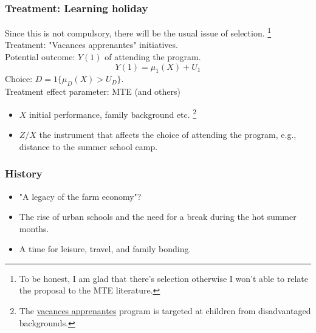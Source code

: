 \documentclass[10pt,mathserif,aspectratio=169]{beamer}
\begin{document}
\begin{frame}[label=summerschool]
  \frametitle{Treatment: Learning holiday}
  Since this is not compulsory, there will be the usual issue of selection.
  \footnote{To be honest, I am glad that there's selection otherwise I won't able to relate the proposal to the MTE literature.}
  \\
  \alert{Treatment}: "Vacances apprenantes" initiatives.\\
  \alert{Potential outcome}: $Y(1)$ of attending the program.
  $$ Y(1) = \mu_1(X)+U_1$$
  \alert{Choice}: $D=1\{\mu_D(X)>U_D\}$.\\
  \alert{Treatment effect parameter}: MTE (and others)
  \begin{itemize}
    \item $X$ initial performance, family background etc. \footnote{The \href{https://www.aide-sociale.fr/vacances-apprenantes/}{vacances apprenantes} program is targeted at children from disadvantaged backgrounds.}
    \item $Z/X$ the instrument that affects the choice of attending the program, e.g., distance to the summer school camp.
  \end{itemize}
\end{frame}

\begin{frame}
  \frametitle{History}
  \begin{itemize}
    \item "A legacy of the farm economy"?
    \item The rise of urban schools and the need for a break during the hot summer
          months.
    \item A time for leisure, travel, and family bonding.
  \end{itemize}
\end{frame}




\end{document}
